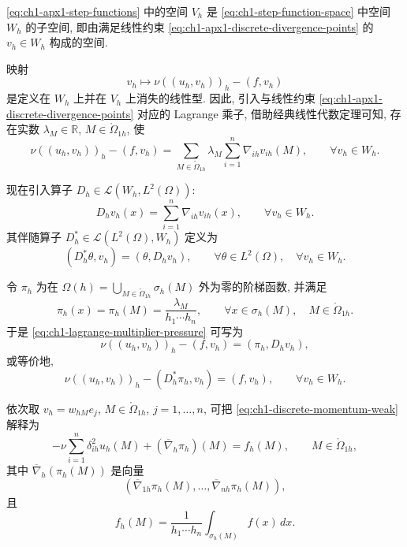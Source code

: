\eqref{eq:ch1-apx1-step-functions} 中的空间 $V_h$ 是 \eqref{eq:ch1-step-function-space} 中空间 $W_h$ 的子空间, 即由满足线性约束 \eqref{eq:ch1-apx1-discrete-divergence-points} 的 $v_h\in W_h$ 构成的空间.

映射
\[
v_h\longmapsto\nu((u_h,v_h))_h-(f,v_h)
\]
是定义在 $W_h$ 上并在 $V_h$ 上消失的线性型. 因此, 引入与线性约束 \eqref{eq:ch1-apx1-discrete-divergence-points} 对应的 Lagrange 乘子, 借助经典线性代数定理可知, 存在实数 $\lambda_M\in\mathbb R$, $M\in\mathring\Omega_{1h}$, 使
\begin{equation}
\nu((u_h,v_h))_h-(f,v_h)
=\sum_{M\in\mathring\Omega_{1h}}\lambda_M
\sum_{i=1}^n\nabla_{ih}v_{ih}(M),
\qquad\forall v_h\in W_h.
\label{eq:ch1-lagrange-multiplier-pressure}
\end{equation}

现在引入算子 $D_h\in\mathcal L(W_h,L^2(\Omega))$:
\begin{equation}
D_hv_h(x)=\sum_{i=1}^n\nabla_{ih}v_{ih}(x),
\qquad\forall v_h\in W_h.
\label{eq:ch1-discrete-divergence-operator}
\end{equation}
其伴随算子 $D_h^\ast\in\mathcal L(L^2(\Omega),W_h)$ 定义为
\begin{equation}
(D_h^\ast\theta,v_h)=(\theta,D_hv_h),
\qquad\forall\theta\in L^2(\Omega),\quad\forall v_h\in W_h.
\label{eq:ch1-discrete-divergence-adjoint}
\end{equation}

令 $\pi_h$ 为在 $\Omega(h)=\bigcup_{M\in\mathring\Omega_{1h}}\sigma_h(M)$ 外为零的阶梯函数, 并满足
\begin{equation}
\pi_h(x)=\pi_h(M)=\frac{\lambda_M}{h_1\cdots h_n},
\qquad\forall x\in\sigma_h(M),\quad M\in\mathring\Omega_{1h}.
\label{eq:ch1-discrete-pressure-definition}
\end{equation}
于是 \eqref{eq:ch1-lagrange-multiplier-pressure} 可写为
\[
\nu((u_h,v_h))_h-(f,v_h)=(\pi_h,D_hv_h),
\]
或等价地,
\begin{equation}
\nu((u_h,v_h))_h-(D_h^\ast\pi_h,v_h)=(f,v_h),
\qquad\forall v_h\in W_h.
\label{eq:ch1-discrete-momentum-weak}
\end{equation}

依次取 $v_h=w_{hM}e_j$, $M\in\mathring\Omega_{1h}$, $j=1,\ldots,n$, 可把 \eqref{eq:ch1-discrete-momentum-weak} 解释为
\begin{equation}
-\nu\sum_{i=1}^n\delta_{ih}^2u_h(M)
+(\overline\nabla_h\pi_h)(M)
=f_h(M),\qquad M\in\mathring\Omega_{1h},
\label{eq:ch1-discrete-momentum-pointwise}
\end{equation}
其中 $\overline\nabla_h(\pi_h(M))$ 是向量
\[
(\overline\nabla_{1h}\pi_h(M),\ldots,\overline\nabla_{nh}\pi_h(M)),
\]
且
\begin{equation}
f_h(M)=\frac1{h_1\cdots h_n}\int_{\sigma_h(M)}f(x)\,dx.
\label{eq:ch1-cell-average-force}
\end{equation}

